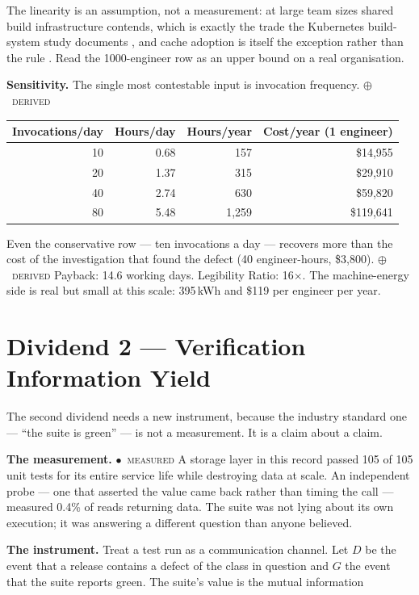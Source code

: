 \documentclass[11pt,a4paper]{article}
\providecommand{\textcite}[1]{\cite{#1}}
\newcommand{\stM}{\textcolor{sigilcyan}{$\bullet$}~{\scriptsize\textsc{measured}}}
\newcommand{\stD}{\textcolor{sigilviolet}{$\oplus$}~{\scriptsize\textsc{derived}}}
\begin{document}
\noindent The linearity is an assumption, not a measurement: at large team sizes shared build infrastructure contends, which is exactly the trade the Kubernetes build-system study documents \textcite{arxiv2510_20041}, and cache adoption is itself the exception rather than the rule \textcite{arxiv2601_19146}. Read the 1000-engineer row as an upper bound on a real organisation.


\textbf{Sensitivity.} The single most contestable input is invocation frequency. \stD{}

\begin{center}\small{}\begin{tabular}{rrrr}\toprule
Invocations/day & Hours/day & Hours/year & Cost/year (1 engineer) \\\midrule
10 & 0.68 & 157 & \$14{,}955 \\
20 & 1.37 & 315 & \$29{,}910 \\
40 & 2.74 & 630 & \$59{,}820 \\
80 & 5.48 & 1{,}259 & \$119{,}641 \\
\bottomrule\end{tabular}\end{center}

\noindent Even the conservative row --- ten invocations a day --- recovers more than the cost of the investigation that found the defect (40 engineer-hours, \$3{,}800). \stD{} Payback: 14.6 working days. Legibility Ratio: 16$\times$. The machine-energy side is real but small at this scale: 395\,kWh and \$119 per engineer per year.


\section{Dividend 2 --- Verification Information Yield}\label{sec:d2}


The second dividend needs a new instrument, because the industry standard one --- ``the suite is green'' --- is not a measurement. It is a claim about a claim.


\textbf{The measurement.} \stM{} A storage layer in this record passed 105 of 105 unit tests for its entire service life while destroying data at scale. An independent probe --- one that asserted the value came back rather than timing the call --- measured 0.4\% of reads returning data. The suite was not lying about its own execution; it was answering a different question than anyone believed.


\textbf{The instrument.} Treat a test run as a communication channel. Let $D$ be the event that a release contains a defect of the class in question and $G$ the event that the suite reports green. The suite's value is the mutual information
\end{document}
